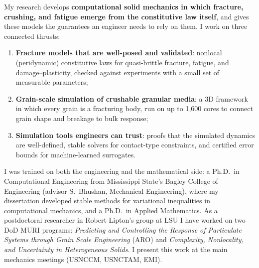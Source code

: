 \documentclass[11pt]{article}
\begin{document}
My research develops \textbf{computational solid mechanics in which fracture,
crushing, and fatigue emerge from the constitutive law itself}, and gives these
models the guarantees an engineer needs to rely on them. I work on three
connected thrusts:
\begin{enumerate}[label=(\roman*),leftmargin=2.2em]
\item \textbf{Fracture models that are well-posed and validated}: nonlocal
      (peridynamic) constitutive laws for quasi-brittle fracture, fatigue, and
      damage--plasticity, checked against experiments with a small set of measurable parameters;
\item \textbf{Grain-scale simulation of crushable granular media}: a 3D
      framework in which every grain is a fracturing body, run on up to
      1{,}600 cores to connect grain shape and breakage to bulk response;
\item \textbf{Simulation tools engineers can trust}: proofs that the
      simulated dynamics are well-defined, stable solvers for contact-type
      constraints, and certified error bounds for machine-learned surrogates.
\end{enumerate}
I was trained on both the engineering and the mathematical side: a Ph.D.\ in
Computational Engineering from Mississippi State's Bagley College of
Engineering (advisor S.~Bhushan, Mechanical Engineering), where my dissertation
developed stable methods for variational inequalities in computational mechanics,
and a Ph.D.\ in Applied Mathematics. As a postdoctoral researcher in Robert
Lipton's group at LSU I have worked on two DoD MURI programs:
\emph{Predicting and Controlling the Response of Particulate Systems through
Grain Scale Engineering} (ARO) and \emph{Complexity, Nonlocality, and
Uncertainty in Heterogeneous Solids}. I present this work at the main
mechanics meetings (USNCCM, USNCTAM, EMI).
\end{document}
